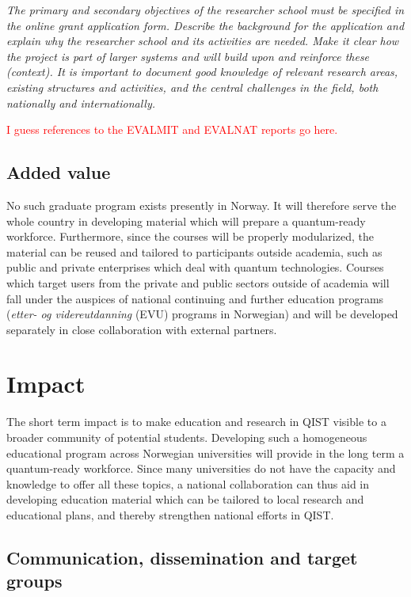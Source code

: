 \documentclass{scrreprt}
\begin{document}
{\em The primary and secondary objectives of the researcher school must be
specified in the online grant application form.  Describe the
background for the application and explain why the researcher school
and its activities are needed. Make it clear how the project is part
of larger systems and will build upon and reinforce these
(context). It is important to document good knowledge of relevant
research areas, existing structures and activities, and the central
challenges in the field, both nationally and internationally.}

\textcolor{red}{I guess references to the EVALMIT and EVALNAT reports go here.}



\subsection{Added value}


No such graduate program exists presently in Norway. It will therefore
serve the whole country in developing material which will prepare a
quantum-ready workforce. Furthermore, since the courses will be
properly modularized, the material can be reused and tailored to
participants outside academia, such as public and private enterprises
which deal with quantum technologies. Courses which target users from
the private and public sectors outside of academia will fall under the
auspices of national continuing and further education programs (\textit{etter- og videreutdanning} (EVU)
programs in Norwegian) and will be developed separately in close
collaboration with external partners.

\section{Impact}


The short term impact is to make education and research in QIST
visible to a broader community of potential students. Developing such a homogeneous educational program across Norwegian universities will provide in the long term a quantum-ready workforce. Since many universities do not have the capacity and knowledge to offer all these topics, a national collaboration can thus aid in developing education material which can be tailored to local research and educational plans, and thereby strengthen national efforts in QIST.

\subsection{Communication, dissemination and target groups}
\end{document}
